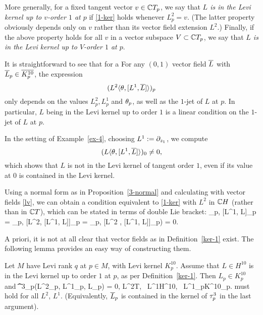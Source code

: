 \documentclass[12pt]{amsart}
\begin{document}
More generally, 
for a fixed tangent vector $v\in {\mathbb{C}} T_p$,
we say that
{\em $L$ is in the Levi kernel up to 
$v$-order $1$ at $p$} 
if \eqref{1-ker}
holds whenever $L^2_p=v$. 
(The latter property obviously depends only on $v$
rather than its vector field extension $L^2$.)
Finally, if the above property holds for all $v$
in a vector subspace $V\subset {\mathbb{C}} T_p$,
we say that
{\em $L$ is in the Levi kernel up to 
$V$-order $1$ at $p$}.
\ed



It is straightforward to see that for a
\bl{}
For any $(0,1)$ vector field $\overline{L}$
with $\overline{L}_p\in \overline{K^{10}_p}$, 
the expression
$$ 
	(L^2 \langle \theta, [L^1, \overline{L}] \rangle)_p 
$$
only depends on the values $L^2_p, L^1_p$ and $\theta_p$,
as well as the $1$-jet of $L$ at $p$.
In particular,  $L$ being in the Levi kernel up to order $1$
is a linear condition on the $1$-jet of $L$ at $p$.
\el

\be
In the setting of Example~\ref{ex-4},
choosing $L^1:= \partial_{z_1}$, we compute
$$
	(L \langle \theta, [L^1, \overline{L}] \rangle )_0 \ne 0,
$$
which shows that $L$ is not in the Levi kernel of tangent order $1$,
even if its value at $0$ is contained in the Levi kernel.
\ee


\br{}
Using a normal form as in Proposition~\ref{3-normal} 
and calculating with vector fields \eqref{lv},
we can obtain a condition equivalent to
 \eqref{1-ker}
with $L^2$ in ${\mathbb{C}} H$ (rather than in ${\mathbb{C}} T$), which can be 
stated in terms of double Lie bracket:
\beq{}
	\la \th_p, [L^1, \1L]_p\ra
	= \la \th_p, [L^2, [L^1, \1L]]_p \ra 
	= \la \th_p, [\1L^2 , [L^1, \1L]]_p\ra)
	= 0.
\eeq
\er



A priori, it is not at all clear
that vector fields as in Definition~\ref{ker-1} exist.
The following lemma
provides an easy way of constructing them.


\bl{}
Let $M$ have Levi rank $q$ at $p\in M$,
with Levi kernel $K^{10}_p$.
Assume that $L\in H^{10}$ is in the Levi kernel
up to order $1$ at $p$,
as per Definition~\ref{ker-1}.
Then $L_p\in K^{10}_p$ and
\beq{}
	\t^3_p(L^2_p, L^1_p, \1L_p) 
	= 0, 
	\quad L^2\in \C T, \, 
	L^1\in H^{10}, \,
	L^1_p\in K^{10}_p.
\eeq
must hold for all $L^2$, $L^1$.
(Equivalently, $\overline{L}_p$ is contained in the kernel of $\tau^3_p$ in the last argument).
\end{document}

